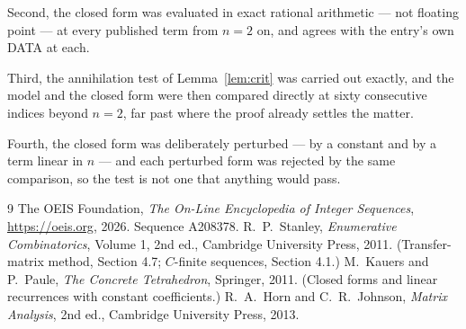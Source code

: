 \documentclass[11pt,a4paper]{article}
\theoremstyle{plain}
\theoremstyle{definition}
\begin{document}
Second, the closed form was evaluated in exact rational arithmetic --- not floating point ---
at every published term from $n=2$ on, and agrees with the entry's own DATA at each.

Third, the annihilation test of Lemma~\ref{lem:crit} was carried out exactly, and the model
and the closed form were then compared directly at sixty consecutive indices beyond
$n=2$, far past where the proof already settles the matter.

Fourth, the closed form was deliberately perturbed --- by a constant and by a term linear in
$n$ --- and each perturbed form was rejected by the same comparison, so the test is not one
that anything would pass.

\begin{thebibliography}{9}
 The OEIS Foundation, \emph{The On-Line Encyclopedia of Integer
Sequences}, \url{https://oeis.org}, 2026. Sequence A208378.
 R.~P.~Stanley, \emph{Enumerative Combinatorics}, Volume 1, 2nd ed.,
Cambridge University Press, 2011. (Transfer-matrix method, Section 4.7; $C$-finite sequences,
Section 4.1.)
 M.~Kauers and P.~Paule, \emph{The Concrete Tetrahedron}, Springer, 2011.
(Closed forms and linear recurrences with constant coefficients.)
 R.~A.~Horn and C.~R.~Johnson, \emph{Matrix Analysis}, 2nd ed., Cambridge
University Press, 2013.
\end{thebibliography}
\end{document}
